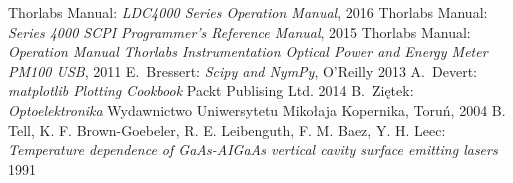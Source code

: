 \begin{thebibliography}{99}
 Thorlabs Manual:
\emph{LDC4000 Series Operation Manual},
2016
 Thorlabs Manual:
\emph{Series 4000 SCPI Programmer's Reference Manual},
2015
 Thorlabs Manual:
\emph{Operation Manual
Thorlabs Instrumentation Optical Power and Energy Meter PM100 USB},
2011
 E.~Bressert:
\emph{Scipy and NymPy},
O'Reilly 2013
  A.~Devert:
\emph{matplotlib Plotting Cookbook}
Packt Publising Ltd. 2014
  B.~Ziętek:
\emph{Optoelektronika}
Wydawnictwo Uniwersytetu Mikołaja Kopernika, Toruń, 2004
 B. Tell, K. F. Brown-Goebeler, R. E. Leibenguth, F. M.  Baez, Y. H. Leec:
\emph{Temperature dependence of GaAs-AIGaAs vertical cavity surface emitting lasers }
1991
\end{thebibliography}

